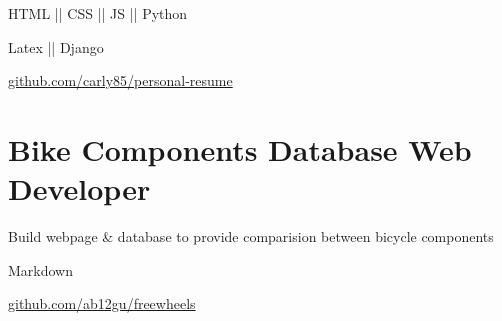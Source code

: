 \vspace{-1.5ex}
{
    \vspace{-0.8ex}
    \color{cyan}\small
    {HTML || CSS || JS || Python}
}

{
    \vspace{-2.5ex}\hspace{1.5in}
    \color{cyan}\small
    {Latex || Django}
}

{
    \vspace{-2.5ex}\hspace{3in}
    \color{blue}\small
    {\href{https://github.com/carly85/personal-resume}{github.com/carly85/personal-resume}{}}
}

\vspace{0.5ex}


\section{
    \textbf{Bike Components Database} \newline
    Web Developer
}{}

\vspace{-2.5ex}

\begin{detail}
    \BulletItem
    Build webpage \& database to provide comparision between bicycle components
\end{detail}

\begin{subtitle}
    \vspace{-5ex}
    {{}} 
\end{subtitle}

\vspace{-1.5ex}
{
    \vspace{-0.8ex}
    \color{cyan}\small
    {Markdown}
}

{
    \vspace{-2.5ex}\hspace{1.5in}
    \color{cyan}\small
    {}
}

{
    \vspace{-2.5ex}\hspace{3in}
    \color{blue}\small
    {\href{https://github.com/ab12gu/freewheels}{github.com/ab12gu/freewheels}{}}
}

\vspace{2.5ex}